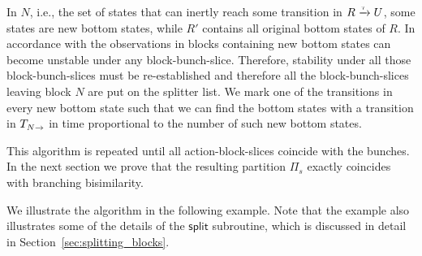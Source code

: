 \documentclass[a4paper,10pt]{article}
\theoremstyle{definition}
\theoremstyle{plain}
\newcommand{\pijl}[1]{\mathrel{\text{$\xrightarrow{\smash[t]{#1}}$}}}
\begin{document}
In $N$, i.e., the set of states that can inertly reach some transition in $R \pijl{\tau} U$,
some states are new bottom states, while $R'$ contains all original bottom states of $R$.
In accordance with the observations in \cite{GV90} blocks containing new bottom states can become unstable under any
block-bunch-slice. Therefore, stability under all those block-bunch-slices must be re-established and therefore all the block-bunch-slices
leaving block $N$ are put on the splitter list.
We mark one of the transitions in every new bottom state
such that we can find the bottom states with a transition in $T_{N\pijl{}}$ in time proportional to the number of such new bottom states.

This algorithm is repeated until all action-block-slices coincide with the bunches. In the next section we prove that the resulting
partition $\Pi_s$ exactly coincides with branching bisimilarity.

We illustrate the algorithm in the following example. Note that the example also illustrates some of the details of the $\mathsf{split}$ subroutine, which is discussed in detail in Section~\ref{sec:splitting_blocks}.
\end{document}
